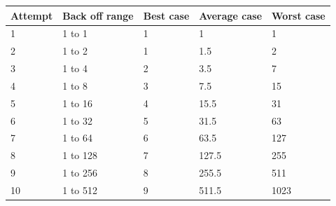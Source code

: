 \begin{table}[ht!]
\centering
\begin{tabular}{ l l l l l }
Attempt                                                                & Back off range                                         & Best case                                       & Average case                                        & Worst case \\ \hline 
\multicolumn{1}{l}{1}                        & \multicolumn{1}{l}{1 to 1}    & \multicolumn{1}{l}{1}  & \multicolumn{1}{l}{1}      & 1          \\
\multicolumn{1}{l}{2}                                                & \multicolumn{1}{l}{1 to 2}                            & \multicolumn{1}{l}{1}                          & \multicolumn{1}{l}{1.5}                            & 2          \\
 
\multicolumn{1}{l}{{3}} & \multicolumn{1}{l}{1 to 4}    & \multicolumn{1}{l}{2}  & \multicolumn{1}{l}{3.5}    & 7          \\
\multicolumn{1}{l}{4}                                                & \multicolumn{1}{l}{1 to 8}                            & \multicolumn{1}{l}{3}                          & \multicolumn{1}{l}{7.5}                            & 15         \\
 
\multicolumn{1}{l}{5}                        & \multicolumn{1}{l}{1 to 16}   & \multicolumn{1}{l}{4}  & \multicolumn{1}{l}{15.5}   & 31         \\
\multicolumn{1}{l}{6}                                                & \multicolumn{1}{l}{1 to 32}                           & \multicolumn{1}{l}{5}                          & \multicolumn{1}{l}{31.5}                           & 63         \\
 
\multicolumn{1}{l}{7}                        & \multicolumn{1}{l}{1 to 64}   & \multicolumn{1}{l}{6}  & \multicolumn{1}{l}{63.5}   & 127        \\
\multicolumn{1}{l}{8}                                                & \multicolumn{1}{l}{1 to 128}                          & \multicolumn{1}{l}{7}                          & \multicolumn{1}{l}{127.5}                          & 255        \\
 
\multicolumn{1}{l}{9}                        & \multicolumn{1}{l}{1 to 256}  & \multicolumn{1}{l}{8}  & \multicolumn{1}{l}{255.5}  & 511        \\
\multicolumn{1}{l}{10}                                               & \multicolumn{1}{l}{1 to 512}                          & \multicolumn{1}{l}{9}                          & \multicolumn{1}{l}{511.5}                          & 1023       \\
 

\end{tabular}
\end{table}
